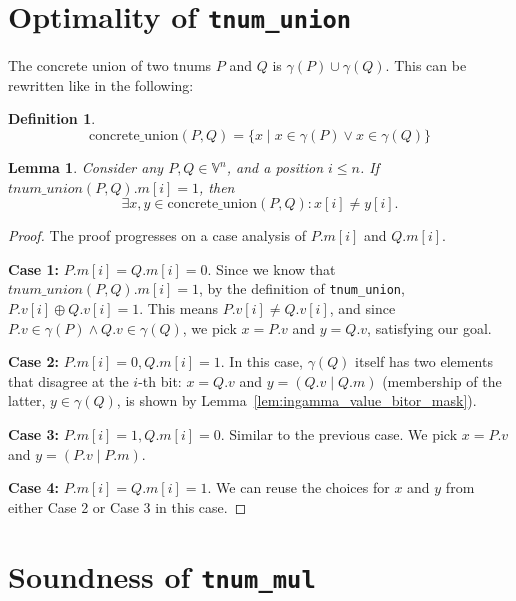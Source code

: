 \documentclass{article}
\newtheorem{lemma}{Lemma}
\newtheorem{definition}{Definition}
\newcommand{\Case}[2]{\textbf{Case #1:} #2}
\newcommand{\wfdomn}{\mathbb{V}^{n}}
\newcommand{\ith}[1]{#1[i]}
\newcommand{\tv}[1]{#1.v}
\newcommand{\tm}[1]{#1.m}
\newcommand{\ithv}[1]{\ith{\tv{#1}}}
\newcommand{\ithm}[1]{\ith{\tm{#1}}}
\newcommand{\ingamma}[2]{#1 \in \gamma(#2)}
\newcommand{\tunion}[2]{tnum\_union(#1, #2)}
\newcommand{\orvm}[1]{(\tv{#1} \mathbin{|} \tm{#1})}
\begin{document}
\section{Optimality of \lstinline{tnum_union}}

The concrete union of two tnums $P$ and $Q$ is $\gamma(P) \cup
\gamma(Q)$. This can be rewritten like in the following:

\begin{definition}
  \[
  \text{concrete\_union}(P, Q) = \{ x \mathbin{|} \ingamma{x}{P} \lor \ingamma{x}{Q} \}
  \]
\end{definition}

\begin{lemma}
  Consider any $P, Q \in \wfdomn$, and a position $i \le n$. If $\ithm{\tunion{P}{Q}} = 1$, then
  \[
  \exists x, y \in \text{concrete\_union}(P, Q) : \ith{x} \neq \ith{y}.
  \]
\end{lemma}

\begin{proof}
  The proof progresses on a case analysis of $\ithm{P}$ and $\ithm{Q}$.

  \Case{1}{$\ithm{P} = \ithm{Q} = 0$}. Since we know that
  $\ithm{\tunion{P}{Q}} = 1$, by the definition of
  \lstinline{tnum_union}, $\ithv{P} \oplus \ithv{Q} = 1$.  This means
  $\ithv{P} \neq \ithv{Q}$, and since $\ingamma{\tv{P}}{P} \land
  \ingamma{\tv{Q}}{Q}$, we pick $x = \tv{P}$ and $y = \tv{Q}$,
  satisfying our goal.

  \Case{2}{$\ithm{P} = 0, \ithm{Q} = 1$}. In this case, $\gamma({Q})$
  itself has two elements that disagree at the $i$-th bit: $x =
  \tv{Q}$ and $y = \orvm{Q}$ (membership of the latter,
  $\ingamma{y}{Q}$, is shown by
  Lemma~\ref{lem:ingamma_value_bitor_mask}).

  \Case{3}{$\ithm{P} = 1, \ithm{Q} = 0$}. Similar to the previous
  case. We pick $x = \tv{P}$ and $y = \orvm{P}$.

  \Case{4}{$\ithm{P} = \ithm{Q} = 1$}. We can reuse the choices for
  $x$ and $y$ from either Case 2 or Case 3 in this case.
\end{proof}

\section{Soundness of \lstinline{tnum_mul}}

\newcommand{\bmulshrId}{\text{bvec\_mul\_loop}}
\newcommand{\bmulshrABC}{\bmulshr{a}{b}{c}}
\newcommand{\bmulshrABCp}{\bmulshr{a'}{b'}{c'}}
\newcommand{\bmulshr}[3]{$\bmulshrId{}(#1, #2, #3)$}
\end{document}
